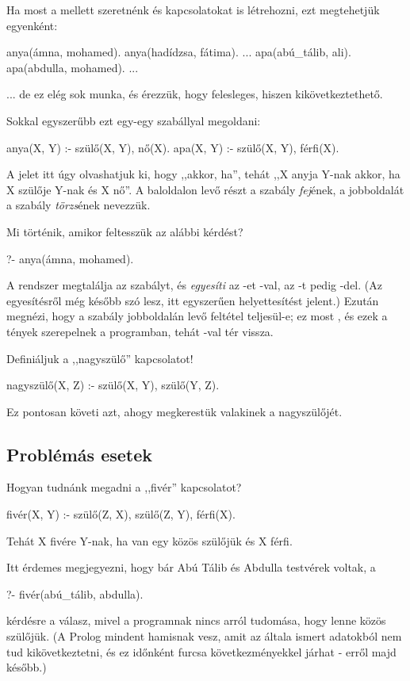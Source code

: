 Ha most a  mellett szeretnénk  és  kapcsolatokat is létrehozni, ezt megtehetjük egyenként:
\begin{program}
anya(ámna, mohamed).
anya(hadídzsa, fátima).
...
apa(abú_tálib, ali).
apa(abdulla, mohamed).
...
\end{program}
... de ez elég sok munka, és érezzük, hogy felesleges, hiszen kikövetkeztethető.

Sokkal egyszerűbb ezt egy-egy szabállyal megoldani:
\begin{program}
anya(X, Y) :- szülő(X, Y), nő(X).
apa(X, Y) :- szülő(X, Y), férfi(X).
\end{program}
A \pr{:-} jelet itt úgy olvashatjuk ki, hogy ,,akkor, ha'', tehát ,,X anyja Y-nak akkor, ha X szülője Y-nak és X nő''. A baloldalon levő részt a szabály \emph{fej}\/ének, a jobboldalát a szabály \emph{törzs}\/ének nevezzük.
  
Mi történik, amikor feltesszük az alábbi kérdést?
\begin{query}
?- anya(ámna, mohamed).
\end{query}
A rendszer megtalálja az  szabályt, és \emph{egyesíti} az -et -val, az -t pedig -del. (Az egyesítésről még később szó lesz, itt egyszerűen helyettesítést jelent.) Ezután megnézi, hogy a szabály jobboldalán levő feltétel teljesül-e; ez most , és ezek a tények szerepelnek a programban, tehát -val tér vissza.

Definiáljuk a ,,nagyszülő'' kapcsolatot!
\begin{program}
nagyszülő(X, Z) :- szülő(X, Y), szülő(Y, Z).
\end{program}
Ez pontosan követi azt, ahogy megkerestük valakinek a nagyszülőjét.

\subsection*{Problémás esetek}

Hogyan tudnánk megadni a ,,fivér'' kapcsolatot?
\begin{program}
fivér(X, Y) :- szülő(Z, X), szülő(Z, Y), férfi(X).
\end{program}
Tehát X fivére Y-nak, ha van egy közös szülőjük és X férfi.

Itt érdemes megjegyezni, hogy bár Abú Tálib és Abdulla testvérek voltak, a
\begin{query}
?- fivér(abú_tálib, abdulla).
\end{query}
kérdésre  a válasz, mivel a programnak nincs arról tudomása, hogy lenne közös szülőjük. (A Prolog mindent hamisnak vesz, amit az általa ismert adatokból nem tud kikövetkeztetni, és ez időnként furcsa következményekkel járhat - erről majd később.)

